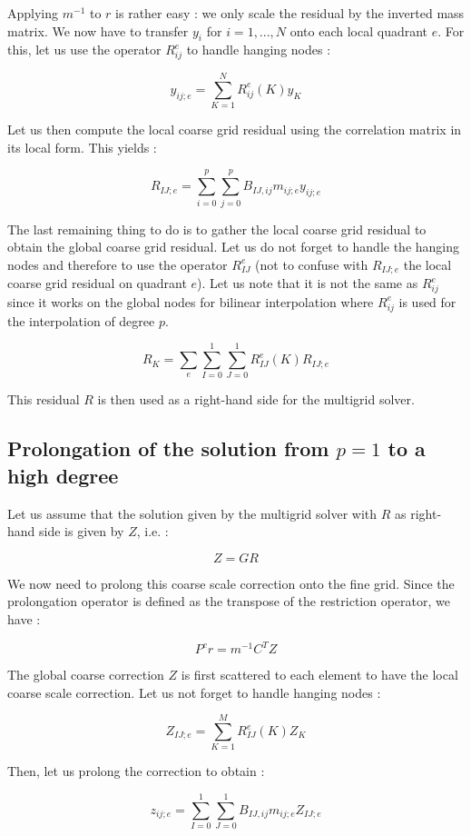 Applying $m^{-1}$ to $r$ is rather easy : we only scale the residual by the inverted mass matrix. We now have to transfer $y_i$ for $i=1,...,N$ onto each local quadrant $e$. For this, let us use the operator $R^e_{ij}$ to handle hanging nodes : 

$$ y_{ij;e} = \sum_{K=1}^N R^e_{ij}(K) y_K$$

Let us then compute the local coarse grid residual using the correlation matrix in its local form. This yields :

$$R_{IJ;e} = \sum_{i=0}^p\sum_{j=0}^p B_{IJ,ij}m_{ij;e}y_{ij;e}$$

The last remaining thing to do is to gather the local coarse grid residual to obtain the global coarse grid residual. Let us do not forget to handle the hanging nodes and therefore to use the operator $R^e_{IJ}$ (not to confuse with $R_{IJ;e}$ the local coarse grid residual on quadrant $e$). Let us note that it is not the same as $R^e_{ij}$ since it works on the global nodes for bilinear interpolation where $R^e_{ij}$ is used for the interpolation of degree $p$. 

$$ R_K = \sum_e \sum_{I=0}^1\sum_{J=0}^1 R^e_{IJ}(K) R_{IJ;e}$$

This residual $R$ is then used as a right-hand side for the multigrid solver. 

\subsection{Prolongation of the solution from $p=1$ to a high degree}

Let us assume that the solution given by the multigrid solver with $R$ as right-hand side is given by $Z$, i.e. : 

$$ Z = GR$$

We now need to prolong this coarse scale correction onto the fine grid. Since the prolongation operator is defined as the transpose of the restriction operator, we have : 

$$P^cr = m^{-1}C^TZ$$

The global coarse correction $Z$ is first scattered to each element to have the local coarse scale correction. Let us not forget to handle hanging nodes : 

$$Z_{IJ;e} = \sum_{K=1}^M R_{IJ}^e(K) Z_K$$

Then, let us prolong the correction to obtain :

$$z_{ij;e} = \sum_{I=0}^1\sum_{J=0}^1 B_{IJ,ij}m_{ij;e}Z_{IJ;e}$$

